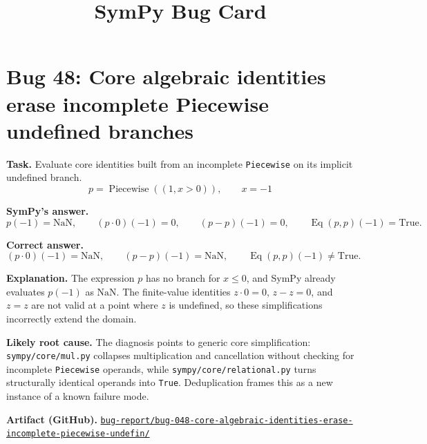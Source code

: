 \documentclass[11pt]{article}
\title{SymPy Bug Card}
\author{}
\date{}
\newcommand{\SymPy}{SymPy}
\newcommand{\artifactrepo}{https://github.com/TODO-org/TODO-repo}
\newcommand{\bugbundle}[1]{\href{\artifactrepo/tree/main/bug-report/#1}{\nolinkurl{bug-report/#1/}}}
\begin{document}
\maketitle

\section*{Bug 48: Core algebraic identities erase incomplete Piecewise undefined branches}

\begin{counterexamplebox}
\textbf{Task.} Evaluate core identities built from an incomplete \texttt{Piecewise}
on its implicit undefined branch.
\[
p=\operatorname{Piecewise}((1,x>0)),\qquad x=-1
\]

\medskip
\textbf{SymPy's answer.}
\[
p(-1)=\mathrm{NaN},\qquad (p\cdot0)(-1)=0,\qquad (p-p)(-1)=0,\qquad
\operatorname{Eq}(p,p)(-1)=\mathrm{True}.
\]

\medskip
\textbf{Correct answer.}
\[
(p\cdot0)(-1)=\mathrm{NaN},\qquad (p-p)(-1)=\mathrm{NaN},\qquad
\operatorname{Eq}(p,p)(-1)\ne\mathrm{True}.
\]

\medskip
\textbf{Explanation.} The expression \(p\) has no branch for \(x\leq0\), and
\SymPy{} already evaluates \(p(-1)\) as \(\mathrm{NaN}\).  The finite-value
identities \(z\cdot0=0\), \(z-z=0\), and \(z=z\) are not valid at a point where
\(z\) is undefined, so these simplifications incorrectly extend the domain.

\medskip
\textbf{Likely root cause.} The diagnosis points to generic core simplification:
\nolinkurl{sympy/core/mul.py} collapses multiplication and cancellation without
checking for incomplete \texttt{Piecewise} operands, while
\nolinkurl{sympy/core/relational.py} turns structurally identical operands into
\texttt{True}.  Deduplication frames this as a new instance of a known failure
mode.

\medskip
\textbf{Artifact (GitHub).} \bugbundle{bug-048-core-algebraic-identities-erase-incomplete-piecewise-undefin}
\end{counterexamplebox}
\end{document}
